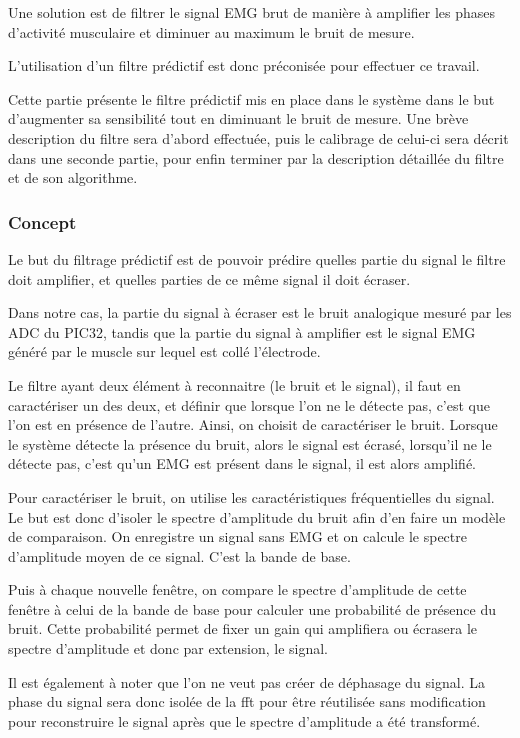 \documentclass[letterpaper, twoside, 12pt, memoire, creativecommons, hyperref]{thETS}
\begin{document}
Une solution est de filtrer le signal EMG brut de manière à amplifier les phases d'activité musculaire et diminuer au maximum le bruit de mesure. 

L'utilisation d'un filtre prédictif est donc préconisée pour effectuer ce travail. 

Cette partie présente le filtre prédictif mis en place dans le système dans le but d'augmenter sa sensibilité tout en diminuant le bruit de mesure. Une brève description du filtre sera d'abord effectuée, puis le calibrage de celui-ci sera décrit dans une seconde partie, pour enfin terminer par la description détaillée du filtre et de son algorithme.

\subsubsection{Concept}

Le but du filtrage prédictif est de pouvoir prédire quelles partie du signal le filtre doit amplifier, et quelles parties de ce même signal il doit écraser.

Dans notre cas, la partie du signal à écraser est le bruit analogique mesuré par les ADC du PIC32, tandis que la partie du signal à amplifier est le signal EMG généré par le muscle sur lequel est collé l'électrode.

Le filtre ayant deux élément à reconnaitre (le bruit et le signal), il faut en caractériser un des deux, et définir que lorsque l'on ne le détecte pas, c'est que l'on est en présence de l'autre. Ainsi, on choisit de caractériser le bruit. Lorsque le système détecte la présence du bruit, alors le signal est écrasé, lorsqu'il ne le détecte pas, c'est qu'un EMG est présent dans le signal, il est alors amplifié.

Pour caractériser le bruit, on utilise les caractéristiques fréquentielles du signal. Le but est donc d'isoler le spectre d'amplitude du bruit afin d'en faire un modèle de comparaison. On enregistre un signal sans EMG et on calcule le spectre d'amplitude moyen de ce signal. C'est la bande de base.

Puis à chaque nouvelle fenêtre, on compare le spectre d'amplitude de cette fenêtre à celui de la bande de base pour calculer une probabilité de présence du bruit. Cette probabilité permet de fixer un gain qui amplifiera ou écrasera le spectre d'amplitude et donc par extension, le signal.

Il est également à noter que l'on ne veut pas créer de déphasage du signal. La phase du signal sera donc isolée de la fft pour être réutilisée sans modification pour reconstruire le signal après que le spectre d'amplitude a été transformé.  
\end{document}
